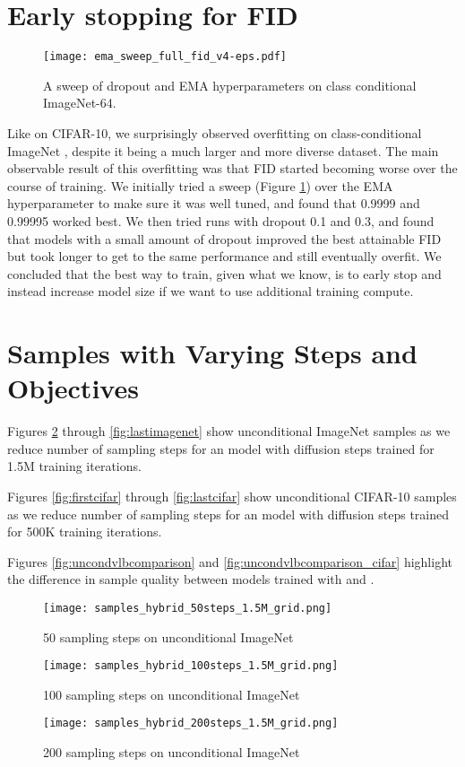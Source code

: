 \documentclass{article}
\begin{document}
\section{Early stopping for FID}
\begin{figure}[ht]
    \centering
    \texttt{[image: ema\_sweep\_full\_fid\_v4-eps.pdf]}
    \caption{\label{fig:emasweep} A sweep of dropout and EMA hyperparameters on class conditional ImageNet-64.}
\end{figure}
Like on CIFAR-10, we surprisingly observed overfitting on class-conditional ImageNet , despite it being a much larger and more diverse dataset. The main observable result of this overfitting was that FID started becoming worse over the course of training. We initially tried a sweep (Figure \ref{fig:emasweep}) over the EMA hyperparameter to make sure it was well tuned, and found that 0.9999 and 0.99995 worked best. We then tried runs with dropout 0.1 and 0.3, and found that models with a small amount of dropout improved the best attainable FID but took longer to get to the same performance and still eventually overfit. We concluded that the best way to train, given what we know, is to early stop and instead increase model size if we want to use additional training compute. 



\section{Samples with Varying Steps and Objectives}
\label{app:samples}

Figures \ref{fig:firstimagenet} through \ref{fig:lastimagenet} show unconditional ImageNet  samples as we reduce number of sampling steps for an  model with  diffusion steps trained for 1.5M training iterations.

Figures \ref{fig:firstcifar} through \ref{fig:lastcifar} show unconditional CIFAR-10 samples as we reduce number of sampling steps for an  model with  diffusion steps trained for 500K training iterations.

Figures \ref{fig:uncondvlbcomparison} and \ref{fig:uncondvlbcomparison_cifar} highlight the difference in sample quality between models trained with  and .

\clearpage

\begin{figure}[h!]
    \centerline{\texttt{[image: samples\_hybrid\_50steps\_1.5M\_grid.png]}}
    \caption{\label{fig:firstimagenet} 50 sampling steps on unconditional ImageNet }
\end{figure}
\begin{figure}[h!]
    \centerline{\texttt{[image: samples\_hybrid\_100steps\_1.5M\_grid.png]}}
    \caption{100 sampling steps on unconditional ImageNet }
\end{figure}
\begin{figure}[h!]
    \centerline{\texttt{[image: samples\_hybrid\_200steps\_1.5M\_grid.png]}}
    \caption{200 sampling steps on unconditional ImageNet }
    \vskip -0.4in
\end{figure}
\end{document}
